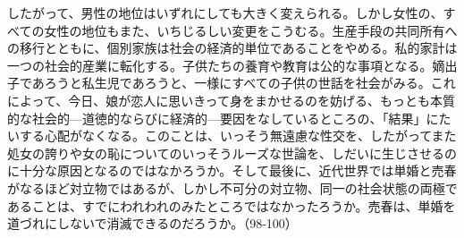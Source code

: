 したがって、男性の地位はいずれにしても大きく変えられる。しかし女性の、すべての女性の地位もまた、いちじるしい変更をこうむる。生産手段の共同所有への移行とともに、個別家族は社会の経済的単位であることをやめる。私的家計は一つの社会的産業に転化する。子供たちの養育や教育は公的な事項となる。嫡出子であろうと私生児であろうと、一様にすべての子供の世話を社会がみる。これによって、今日、娘が恋人に思いきって身をまかせるのを妨げる、もっとも本質的な社会的{\——}道徳的ならびに経済的{\——}要因をなしているところの、「結果」にたいする心配がなくなる。このことは、いっそう無遠慮な性交を、したがってまた処女の誇りや女の恥についてのいっそうルーズな世論を、しだいに生じさせるのに十分な原因となるのではなかろうか。そして最後に、近代世界では単婚と売春がなるほど対立物ではあるが、しかし不可分の対立物、同一の社会状態の両極であることは、すでにわれわれのみたところではなかったろうか。売春は、単婚を道づれにしないで消滅できるのだろうか。（98-100）







